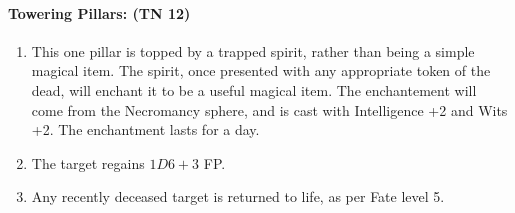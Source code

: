 \begin{multicols}{2}
\columnbreak

\paragraph{Towering Pillars: (TN 12)}

\begin{enumerate}

	\item{This one pillar is topped by a trapped spirit, rather than being a simple magical item.  The spirit, once presented with any appropriate token of the dead, will enchant it to be a useful magical item.  The enchantement will come from the Necromancy sphere, and is cast with Intelligence +2 and Wits +2.  The enchantment lasts for a day.}
	\item{The target regains $1D6+3$ FP.}
	\item{Any recently deceased target is returned to life, as per Fate level 5.}

\end{enumerate}

\end{multicols}

\stopcontents[town]


